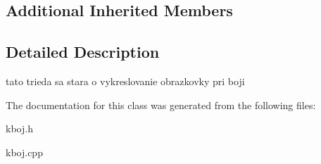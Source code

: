 \subsection*{Additional Inherited Members}


\subsection{Detailed Description}
tato trieda sa stara o vykreslovanie obrazkovky pri boji 

The documentation for this class was generated from the following files\-:\begin{DoxyCompactItemize}
\item 
kboj.\-h\item 
kboj.\-cpp\end{DoxyCompactItemize}

